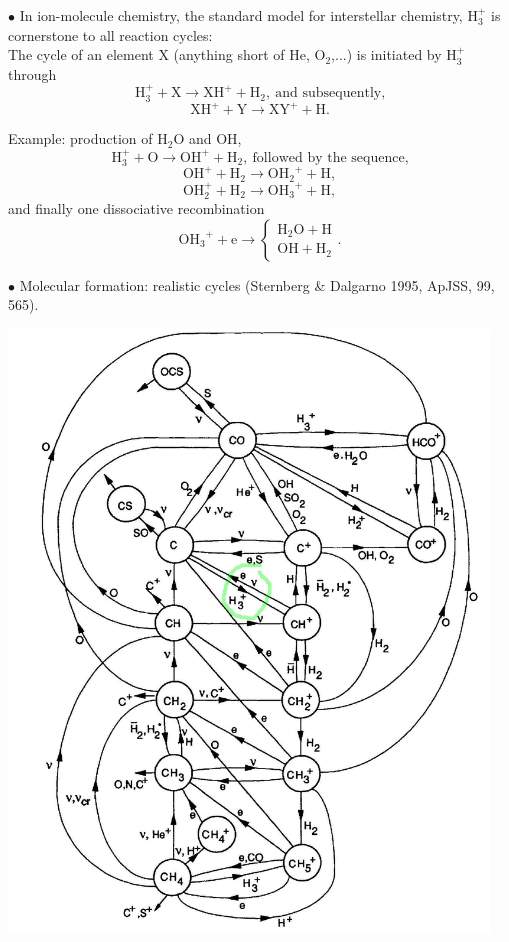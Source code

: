 \foilhead{}


$\bullet$ In ion-molecule chemistry, the standard model for
interstellar chemistry, H$_3^+$ is cornerstone to all reaction cycles:
\\ 

The cycle of an element X (anything short of He, O$_2$,...)  is 
initiated  by H$_3^+$ through 
\[ \mathrm{H}_3^+ + \mathrm{X} \rightarrow \mathrm{XH^+} + \mathrm{H}_2,~
\text{and subsequently,}\]
\[ \mathrm{XH^+} + \mathrm{Y} \rightarrow \mathrm{XY}^+ + \mathrm{H}
.\]

Example: production of $\mathrm{H_2O}$ and OH, \\
\[ \mathrm{H}_3^+ + \mathrm{O} \rightarrow \mathrm{OH^+} + \mathrm{H}_2,~
\text{followed by the sequence,}\]
\[ \mathrm{OH^+} + \mathrm{H}_2 \rightarrow \mathrm{OH_2}^+ +
\mathrm{H},  \]
\[ \mathrm{OH_2^+} + \mathrm{H}_2 \rightarrow \mathrm{OH_3}^+ +
\mathrm{H}, \]
 and finally one dissociative recombination  
\[ \mathrm{OH_3}^+ + \mathrm{e} \rightarrow \left\{ \begin{array}{l}
  \mathrm{H_2O} + \mathrm{H}\\ \mathrm{OH} + \mathrm{H_2} \end{array} \right. . \]




\foilhead{} 

$\bullet$  Molecular formation: realistic cycles (Sternberg \& Dalgarno 1995, ApJSS, 99, 565).


\begin{center}
\includegraphics[width=!,height=16cm]{./B/C_network_2.jpg}
\end{center}

